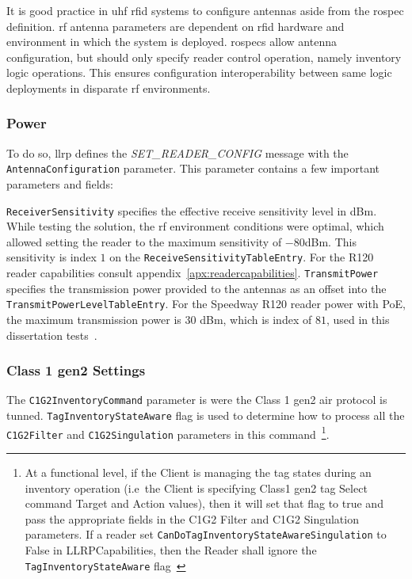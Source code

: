 It is good practice in \ac{uhf} \ac{rfid} systems to configure antennas aside from the \ac{rospec} definition. \ac{rf} antenna parameters are dependent on \ac{rfid} hardware and environment in which the system is deployed. \acp{rospec} allow antenna configuration, but should only specify reader control operation, namely inventory logic operations. This ensures configuration interoperability between same logic deployments in disparate \ac{rf} environments.

\subsubsection{Power}

To do so, \ac{llrp} defines the \textit{SET\_READER\_CONFIG} message with the \texttt{AntennaConfiguration} parameter.
This parameter contains a few important parameters and fields:

\texttt{ReceiverSensitivity} specifies the effective receive sensitivity level in dBm. While testing the solution, the \ac{rf} environment conditions were optimal, which allowed setting the reader to the maximum sensitivity of $-80$dBm. This sensitivity is index $1$ on the \texttt{ReceiveSensitivityTableEntry}. For the R120 reader capabilities consult appendix~\ref{apx:readercapabilities}.
\texttt{TransmitPower} specifies the transmission power provided to the antennas as an offset into the \texttt{TransmitPowerLevelTableEntry}. For the Speedway R120 reader power with PoE, the maximum transmission power is $30$ dBm, which is index of $81$, used in this dissertation tests~\cite{ImpinjOctaneLLRP, SettingReceiveSensitivity}.

\subsubsection{Class 1 \ac{gen2} Settings}

The \texttt{C1G2InventoryCommand} parameter is were the Class 1 \ac{gen2} air protocol is tunned.
\texttt{TagInventoryStateAware} flag is used to determine how to process all the \texttt{C1G2Filter} and \texttt{C1G2Singulation} parameters in this command~\footnote{At a functional level, if the Client is managing the tag states during an inventory operation (i.e\ the Client is specifying Class1 \ac{gen2} tag Select command Target and Action values), then it will set that flag to true and pass the appropriate fields in the C1G2 Filter and C1G2 Singulation parameters. If a reader set \texttt{CanDoTagInventoryStateAwareSingulation} to False in LLRPCapabilities, then the Reader shall ignore the \texttt{TagInventoryStateAware} flag~\cite{LowLevelReader}}.

